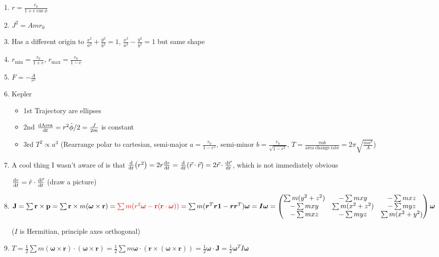 \documentclass{article}
\theoremstyle{remark}
\theoremstyle{remark}
\begin{document}
\begin{enumerate}
    \item $\boxed{r=\frac{r_0}{1+e\cos\phi}}$
    \item $\boxed{J^2 = Amr_0}$
    \item Has a different origin to $\frac{x^2}{a^2}+\frac{y^2}{b^2}=1$, $\frac{x^2}{a^2}-\frac{y^2}{b^2}=1$ but same shape
    \item $r_{\mathrm{min}}=\frac{r_0}{1+e}$, $r_{\mathrm{max}}=\frac{r_0}{1-e}$
    \item $F=-\frac{A}{r^2}$
    \item Kepler\begin{itemize}
        \item 1st Trajectory are ellipses
        \item 2nd $\dv{\mathrm{Area}}{t}=r^2\dot\phi/2=\frac{J}{2m}$ is constant
        \item 3rd $T^2 \propto a^3$ (Rearrange polar to cartesian, semi-major $a=\frac{r_0}{1-e^2}$, semi-minor $b=\frac{r_0}{\sqrt{1-e^2}}$, $T=\frac{\pi ab}{\mathrm{area\ change\ rate}}=2\pi\sqrt{\frac{ma^3}{A}}$)
    \end{itemize}
    \item A cool thing I wasn't aware of is that $\dv{t}(r^2) = 2r\dv{r}{t} = \dv{t}(\vec{r}\cdot\vec{r}) = 2\vec{r}\cdot\dv{\vec{r}}{t}$, which is not immediately obvious
    
    $\dv{r}{t} = \hat{r}\cdot\dv{\vec{r}}{t}$ (draw a picture)

    \item $\vb{J}=\sum\vb{r}\times\vb{p}=\sum\vb{r}\times m(\bm{\omega}\times\vb{r})=\textcolor{red}{\sum m(r^2\bm{\omega}-\vb{r}(\vb{r}\cdot\bm{\omega}))} = \sum m(\bm{r}^T\bm{r}\bm{1}-\bm{r}\bm{r}^T)\bm{\omega} = \bm{I}\bm{\omega} = \begin{pmatrix}
        \textstyle\sum m(y^2+z^2) & -\textstyle\sum mxy & -\textstyle\sum mxz\\
        -\textstyle\sum mxy & \textstyle\sum m(x^2+z^2) & -\textstyle\sum myz\\
        -\textstyle\sum mxz & -\textstyle\sum myz & \textstyle\sum m(x^2+y^2)\\
    \end{pmatrix}\bm{\omega} $

    ($I$ is Hermitian, principle axes orthogonal)

    \item $T = \frac{1}{2}\sum m(\bm{\omega}\times\bm{r})\cdot(\bm{\omega}\times\bm{r}) = \frac{1}{2}\sum m\bm{\omega}\cdot(\bm{r}\times(\bm{\omega}\times\bm{r})) = \frac{1}{2}\bm{\omega}\cdot\bm{J} = \frac{1}{2}\bm{\omega}^T I\bm{\omega}$
    

\end{enumerate}
\end{document}
